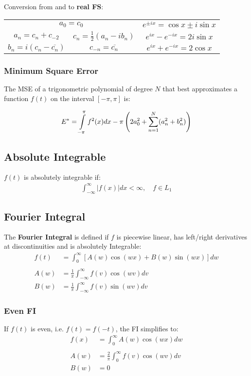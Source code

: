 Conversion from and to \textbf{real FS}:\\
\begin{tabular}[h]{c|c|c} %
    \multicolumn{2}{c}{$a_0=c_0$} & $e^{\pm ix}=\cos x\pm i\sin x$                             \\
    $a_n=c_n+c_{-2}$              & $c_n = \frac{1}{2}(a_n-ib_n)$  & $e^{ix}-e^{-ix}=2i\sin x$ \\
    $b_n=i(c_n-\overline{c_n})$   & $c_{-n}=\overline{c_n}$        & $e^{ix}+e^{-ix}=2\cos x$
\end{tabular}

\subsubsection{Minimum Square Error}
The MSE of a trigonometric polynomial of degree $N$ that best approximates a function $f(t)$ on the interval $[-\pi,\pi]$ is:

\begin{align*}
    E^*=\intop_{-\pi}^\pi f^2(x)dx-\pi\left(2a_0^2+\sum_{n=1}^N(a_n^2+b_n^2)\right)
\end{align*}

\subsection{Absolute Integrable}
$f(t)$ is absolutely integrable if:
\begin{align*}
    \int_{-\infty}^{\infty}\left|f(x)\right|dx<\infty ,\quad f\in L_1
\end{align*}
\subsection{Fourier Integral}
The \textbf{Fourier Integral} is defined if $f$ is piecewise linear, has left/right derivatives at
discontinuities and is absolutely Integrable:
\begin{align*}
    f(t) & =\int_0^\infty[A(w)\cos(wx)+B(w)\sin(wx)]dw     \\\\
    A(w) & =\frac1\pi\int_{-\infty}^{\infty}f(v)\cos(wv)dv \\
    B(w) & =\frac1\pi\int_{-\infty}^{\infty}f(v)\sin(wv)dv
\end{align*}

\subsubsection{Even FI}
If $f(t)$ is even, i.e. $f(t)=f(-t)$, the FI simplifies to:
\begin{align*}
    f(x) & =\int_0^\infty A(w)\cos(wx)dw          \\\\
    A(w) & =\frac2\pi\int_0^\infty f(v)\cos(wv)dv \\
    B(w) & =0
\end{align*}

